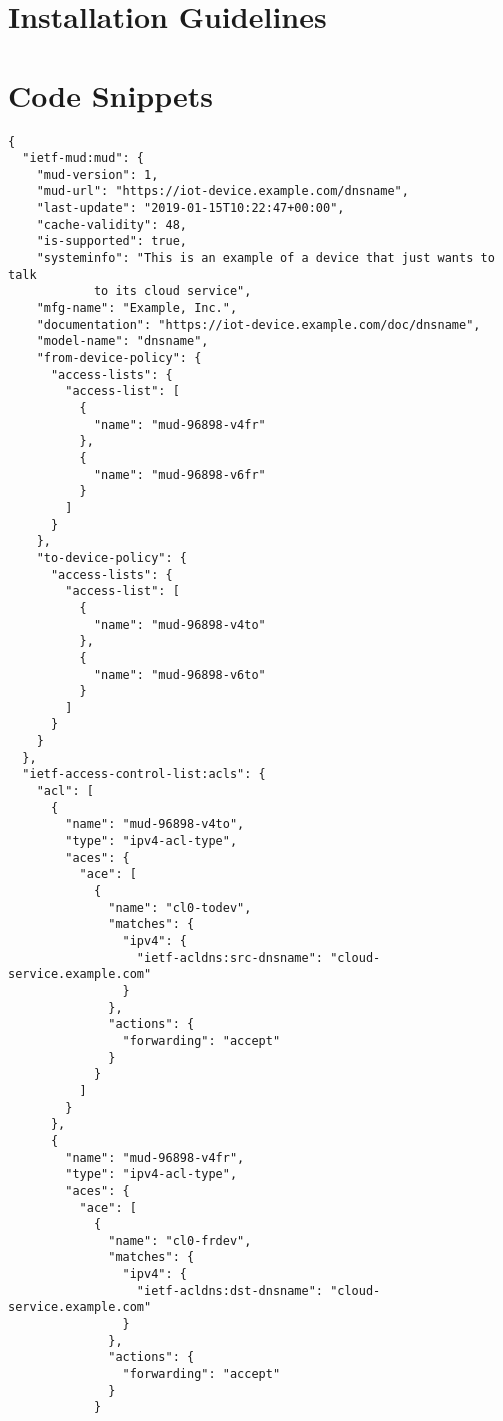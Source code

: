 \appendix

\chapter{Installation Guidelines}


\chapter{Code Snippets}

\begin{verbatim}
{
  "ietf-mud:mud": {
    "mud-version": 1,
    "mud-url": "https://iot-device.example.com/dnsname",
    "last-update": "2019-01-15T10:22:47+00:00",
    "cache-validity": 48,
    "is-supported": true,
    "systeminfo": "This is an example of a device that just wants to talk
		    to its cloud service",
    "mfg-name": "Example, Inc.",
    "documentation": "https://iot-device.example.com/doc/dnsname",
    "model-name": "dnsname",
    "from-device-policy": {
      "access-lists": {
        "access-list": [
          {
            "name": "mud-96898-v4fr"
          },
          {
            "name": "mud-96898-v6fr"
          }
        ]
      }
    },
    "to-device-policy": {
      "access-lists": {
        "access-list": [
          {
            "name": "mud-96898-v4to"
          },
          {
            "name": "mud-96898-v6to"
          }
        ]
      }
    }
  },
  "ietf-access-control-list:acls": {
    "acl": [
      {
        "name": "mud-96898-v4to",
        "type": "ipv4-acl-type",
        "aces": {
          "ace": [
            {
              "name": "cl0-todev",
              "matches": {
                "ipv4": {
                  "ietf-acldns:src-dnsname": "cloud-service.example.com"
                }
              },
              "actions": {
                "forwarding": "accept"
              }
            }
          ]
        }
      },
      {
        "name": "mud-96898-v4fr",
        "type": "ipv4-acl-type",
        "aces": {
          "ace": [
            {
              "name": "cl0-frdev",
              "matches": {
                "ipv4": {
                  "ietf-acldns:dst-dnsname": "cloud-service.example.com"
                }
              },
              "actions": {
                "forwarding": "accept"
              }
            }

\end{verbatim}
